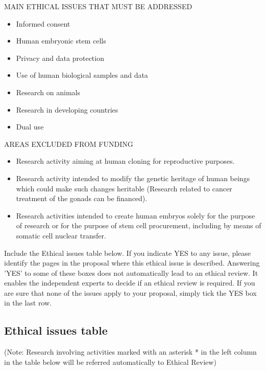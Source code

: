 \documentclass[11pt]{ltxdoc}
\begin{document}
MAIN ETHICAL ISSUES THAT MUST BE ADDRESSED
\begin{itemize}
\item Informed consent
\item Human embryonic stem cells
\item Privacy and data protection
\item Use of human biological samples and data
\item Research on animals
\item Research in developing countries
\item Dual use
\end{itemize}

AREAS EXCLUDED FROM FUNDING
\begin{itemize}
\item Research activity aiming at human cloning for reproductive
  purposes.
\item Research activity intended to modify the genetic heritage of
  human beings which could make such changes heritable (Research
  related to cancer treatment of the gonads can be financed).
\item Research activities intended to create human embryos solely for
  the purpose of research or for the purpose of stem cell procurement,
  including by means of somatic cell nuclear transfer.
\end{itemize}

Include the Ethical issues table below. If you indicate YES to any
issue, please identify the pages in the proposal where this ethical
issue is described. Answering 'YES' to some of these boxes does not
automatically lead to an ethical review. It enables the independent
experts to decide if an ethical review is required. If you are sure
that none of the issues apply to your proposal, simply tick the YES
box in the last row.

\clearpage

\subsection{Ethical issues table}

(Note: Research involving activities marked with an asterisk * in the
left column in the table below will be referred automatically to
Ethical Review)

\renewcommand{\tabularxcolumn}[1]{>{\arraybackslash}m{#1}}
\end{document}

